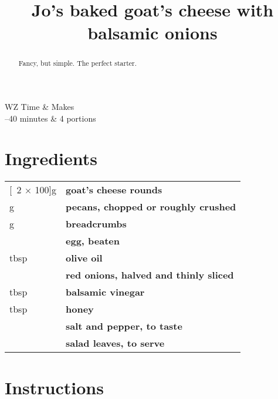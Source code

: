 \documentclass[main.tex]{subfiles}
\title{Jo's baked goat’s cheese with balsamic onions}
\begin{document}
\maketitle

\begin{margintable}
\begin{tabularx}{\textwidth}{WZ}
Time & Makes\\ 
--40 minutes & 4 portions\\
\end{tabularx}
\end{margintable}

\begin{abstract}
Fancy, but simple. The perfect starter.
\end{abstract}

\section{Ingredients}

\vspace*{-\baselineskip}
\begin{table}[ht]
	\begin{tabularx}{\textwidth}{>{\hsize=0.333\hsize}X>{\bf\hsize=1\hsize}X}
	\unit[2 $\times$ 100]{g} & goat's cheese rounds\\
	\unit[50]{g} & pecans, chopped or roughly crushed\\
	\unit[25]{g} & breadcrumbs\\
	\unit[1]{} & egg, beaten\\
	\unit[3]{tbsp} & olive oil \\
	\unit[2]{} & red onions, halved and thinly sliced \\
	\unit[4]{tbsp} & balsamic vinegar \\
	\unit[4]{tbsp} & honey \\
    \unit[]{} & salt and pepper, to taste \\
    \unit[]{} & salad leaves, to serve
	\end{tabularx}
\end{table}

\section{Instructions}
\end{document}
